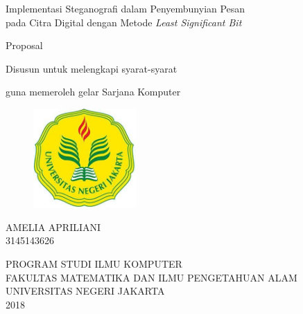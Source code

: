 \thispagestyle{empty}
\begin{center}
\large {Implementasi Steganografi dalam Penyembunyian Pesan \\ pada Citra Digital dengan Metode \emph{Least Significant Bit}}
\end{center}
\bigskip
\vspace{2mm}


\begin{center}
\large{Proposal}

\large{Disusun untuk melengkapi syarat-syarat}

\large{guna memeroleh gelar Sarjana Komputer}

\end{center}


\vspace{5mm}

\begin{figure}[htbp]
\begin{center}
 \includegraphics[width=0.35\textwidth,]{gambar/unj.jpg}
       \end{center}
\end{figure}

\begin{center}
\large{AMELIA APRILIANI}\\
 \large{3145143626}
\end{center}

\vspace{20mm}

\begin{center}
{PROGRAM STUDI ILMU KOMPUTER\\
FAKULTAS MATEMATIKA DAN ILMU PENGETAHUAN ALAM \\
UNIVERSITAS NEGERI JAKARTA \\ 2018}
\end{center}
